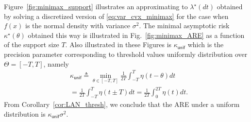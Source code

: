 \documentclass[letterpaper, 11pt]{IEEEtran}      %
\newcommand{\unif}{\mathsf{unif}}
\begin{document}
Figure~\ref{fig:minimax_support} illustrates an approximating to $\lambda^\star(dt)$ obtained by solving a discretized version of \eqref{eq:var_cvx_minimax} for the case when $f(x)$ is the normal density with variance $\sigma^2$. The minimal asymptotic risk $\kappa^\star(\theta)$ obtained this way is illustrated in Fig.~\ref{fig:minimax_ARE} as a function of the support size $T$. Also illustrated in these Figures is $\kappa_{\unif}$ which is the precision parameter corresponding to threshold values uniformly distribution over $\Theta = [-T,T]$, namely
\begin{align}
& \kappa_{\unif} \triangleq \min_{\theta \in [-T,T]} \frac{1}{2T}\int_{-T}^T \eta\left(t-\theta\right) dt \nonumber
 \\
& = 
\frac{1}{2T}\int_{-T}^{T} \eta\left(t\pm T\right) dt
= \frac{1}{2T}\int_{0}^{2T} \eta(t) dt  \label{eq:uniform_risk}. 
\end{align}
From Corollary~\ref{cor:LAN_thresh}, we conclude that the ARE under a uniform distribution is $\kappa_\unif \sigma^2$. \\
\end{document}
